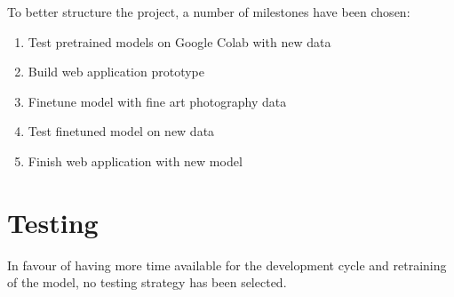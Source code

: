 To better structure the project, a number of milestones have been chosen:

\begin{enumerate}
	\item Test pretrained models on Google Colab with new data
	\item Build web application prototype
	\item Finetune model with fine art photography data
	\item Test finetuned model on new data
	\item Finish web application with new model
\end{enumerate}

\section{Testing}

In favour of having more time available for the development cycle and retraining of the model, no testing strategy has been selected.